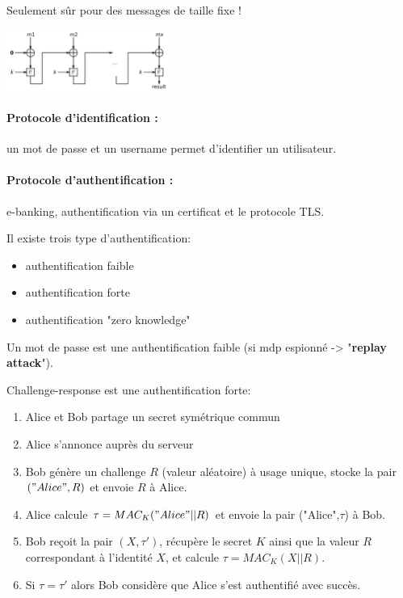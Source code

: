 \documentclass[11pt,a4paper]{report}
\begin{document}
Seulement sûr pour des messages de taille fixe !

\begin{center}
    \includegraphics[width=0.4\textwidth]{img/cbc_mac.png}
\end{center}

\paragraph*{Protocole d'identification :} un mot de passe et un username permet d'identifier un uti\-lisateur.

\paragraph*{Protocole d'authentification :} e-banking, authentification via un certificat et le protocole TLS.

Il existe trois type d'authentification:
\begin{itemize}
    \item authentification faible
    \item authentification forte
    \item authentification "zero knowledge"
\end{itemize}

Un mot de passe est une authentification faible (si mdp espionné -> "\textbf{replay attack}").

Challenge-response est une authentification forte:
\begin{enumerate}
    \item Alice et Bob partage un secret symétrique commun
    \item Alice s'annonce auprès du serveur
    \item Bob génère un challenge $R$ (valeur aléatoire) à usage unique, stocke la pair $("Alice",R)$ et envoie $R$ à Alice.
    \item Alice calcule $\tau = MAC_K("Alice"||R)$ et envoie la pair ("Alice",$\tau$) à Bob.
    \item Bob reçoit la pair $(X,\tau')$, récupère le secret $K$ ainsi que la valeur $R$ correspondant à l'identité $X$, et calcule $\tau = MAC_K(X||R)$.
    \item Si $\tau=\tau'$ alors Bob considère que Alice s'est authentifié avec succès.
\end{enumerate}
\end{document}
